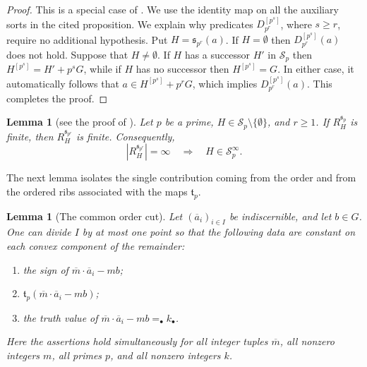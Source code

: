 \documentclass{article}
\theoremstyle{definition}
\theoremstyle{remark}
\theoremstyle{plain}
\newtheorem{lem}[dfn]{Lemma}
\begin{document}
\begin{proof}
	This is a special case of \cite[Proposition 2.26]{Okura2026DisOrd}.
	We use the identity map on all the auxiliary sorts in the cited proposition.
	We explain why predicates $D_{p^r}^{[p^s]}$, where $s\geq r$, require no additional hypothesis.
	Put $H=\mathfrak{s}_{p^r}(a)$.
	If $H = \emptyset$ then $D_{p^r}^{[p^s]}(a)$ does not hold.
	Suppose that $H \neq \emptyset$.
	If $H$ has a successor $H'$ in $\mathcal{S}_p$ then $H^{[p^s]}=H'+p^sG$, while if $H$ has no successor then $H^{[p^s]}=G$.
	In either case, it automatically follows that $a \in H^{[p^s]} + p^r G$, which implies $D_{p^r}^{[p^s]}(a)$.
	This completes the proof.
\end{proof}

\begin{lem}[{see the proof of \cite[Lemma 3.4]{Okura2026DisOrd}}]\label{lem:HigherPrimePowerRibs}
	Let $p$ be a prime, $H\in\mathcal{S}_p\setminus\{\emptyset\}$, and $r\geq 1$.
	If $R_H^{\mathfrak{s}_p}$ is finite, then $R_H^{\mathfrak{s}_{p^r}}$ is finite.
	Consequently,
	\[
		\left|R_H^{\mathfrak{s}_{p^r}}\right|=\infty
		\quad\Longrightarrow\quad
		H\in\mathcal{S}_p^\infty.
	\]
\end{lem}

The next lemma isolates the single contribution coming from the order and from the ordered ribs associated with the maps $\mathfrak{t}_p$.

\begin{lem}[The common order cut]\label{lem:CommonOrderCut}
	Let $(\overline{a}_i)_{i\in I}$ be indiscernible, and let $b\in G$.
	One can divide $I$ by at most one point so that the following data are constant on each convex component of the remainder:
	\begin{enumerate}
		\item the sign of $\overline{m}\cdot\overline{a}_i-mb$;
		\item $\mathfrak{t}_p(\overline{m}\cdot\overline{a}_i-mb)$;
		\item the truth value of $\overline{m}\cdot\overline{a}_i-mb =_{\bullet} k_{\bullet}$.
	\end{enumerate}
	Here the assertions hold simultaneously for all integer tuples $\overline{m}$, all nonzero integers $m$, all primes $p$, and all nonzero integers $k$.
\end{lem}
\end{document}
